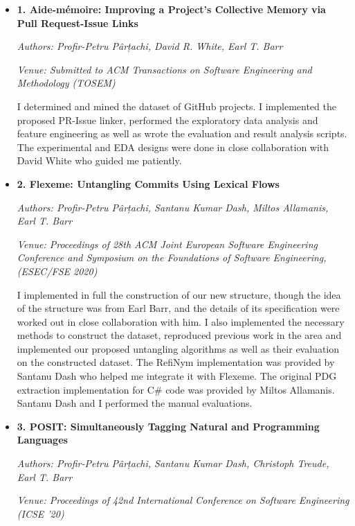 \begin{itemize}[leftmargin=*]
    \item[]\noindent\textbf{1. Aide-mémoire: Improving a Project’s Collective Memory via Pull
Request-Issue Links} 

    \noindent\emph{Authors: Profir-Petru Pârțachi, David R. White, Earl T. Barr}

    \noindent\emph{Venue: Submitted to ACM Transactions on Software Engineering
    and Methodology (TOSEM)}

    \noindent I determined and mined the dataset of GitHub projects. I
    implemented the proposed PR-Issue linker, performed the exploratory data
    analysis and feature engineering as well as wrote the evaluation and result
    analysis scripts. The experimental and EDA designs were done in close
    collaboration with David White who guided me patiently.

    \item[]\noindent\textbf{2. Flexeme: Untangling Commits Using Lexical Flows}

    \noindent\emph{Authors: Profir-Petru Pârțachi, Santanu Kumar Dash, Miltos
    Allamanis, Earl T. Barr}

    \noindent\emph{Venue: Proceedings of 28th ACM Joint European Software
    Engineering Conference and Symposium on the Foundations of Software
    Engineering, (ESEC/FSE 2020)}

    \noindent I implemented in full the construction of our new structure,
    though the idea of the structure was from Earl Barr, and the details of its
    specification were worked out in close collaboration with him. I also
    implemented the necessary methods to construct the dataset, reproduced
    previous work in the area and implemented our proposed untangling algorithms
    as well as their evaluation on the constructed dataset. The RefiNym
    implementation was provided by Santanu Dash who helped me integrate it with
    Flexeme. The original PDG extraction implementation for C\# code was
    provided by Miltos Allamanis. Santanu Dash and I performed the manual
    evaluations.

    \item[]\noindent\textbf{3. POSIT: Simultaneously Tagging Natural and Programming
    Languages} 

    \noindent\emph{Authors: Profir-Petru Pârțachi, Santanu Kumar Dash, Christoph
    Treude, Earl T. Barr}

    \noindent\emph{Venue: Proceedings of 42nd International Conference on
    Software Engineering (ICSE ’20)}


\end{itemize}

